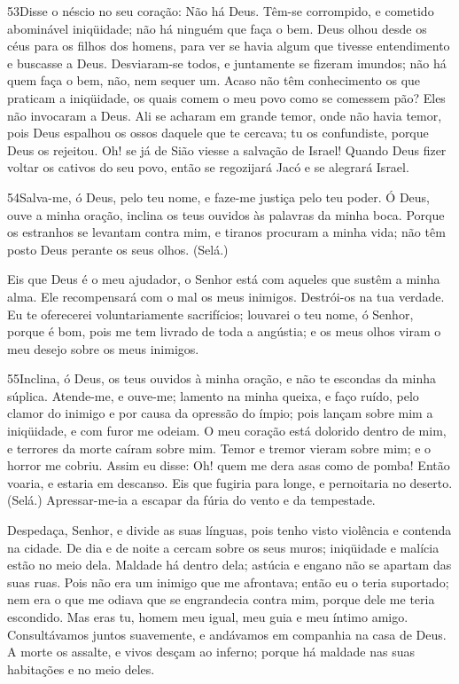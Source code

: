 \bigskip

\lettrine{53}{}Disse o néscio no seu coração: Não há Deus.
Têm-se corrompido, e cometido abominável iniqüidade; não há ninguém
que faça o bem. Deus olhou desde os céus para os filhos dos
homens, para ver se havia algum que tivesse entendimento e buscasse
a Deus. Desviaram-se todos, e juntamente se fizeram imundos; não
há quem faça o bem, não, nem sequer um. Acaso não têm
conhecimento os que praticam a iniqüidade, os quais comem o meu povo
como se comessem pão? Eles não invocaram a Deus. Ali se acharam
em grande temor, onde não havia temor, pois Deus espalhou os ossos
daquele que te cercava; tu os confundiste, porque Deus os rejeitou.
Oh! se já de Sião viesse a salvação de Israel! Quando Deus fizer
voltar os cativos do seu povo, então se regozijará Jacó e se
alegrará Israel.

\bigskip

\lettrine{54}{}Salva-me, ó Deus, pelo teu nome, e faze-me
justiça pelo teu poder. Ó Deus, ouve a minha oração, inclina os
teus ouvidos às palavras da minha boca. Porque os estranhos se
levantam contra mim, e tiranos procuram a minha vida; não têm posto
Deus perante os seus olhos. (Selá.)

Eis que Deus é o meu ajudador, o Senhor está com aqueles que
sustêm a minha alma. Ele recompensará com o mal os meus
inimigos. Destrói-os na tua verdade. Eu te oferecerei
voluntariamente sacrifícios; louvarei o teu nome, ó Senhor, porque é
bom, pois me tem livrado de toda a angústia; e os meus olhos
viram o meu desejo sobre os meus inimigos.

\bigskip

\lettrine{55}{}Inclina, ó Deus, os teus ouvidos à minha oração,
e não te escondas da minha súplica. Atende-me, e ouve-me;
lamento na minha queixa, e faço ruído, pelo clamor do inimigo e
por causa da opressão do ímpio; pois lançam sobre mim a iniqüidade,
e com furor me odeiam. O meu coração está dolorido dentro de
mim, e terrores da morte caíram sobre mim. Temor e tremor vieram
sobre mim; e o horror me cobriu. Assim eu disse: Oh! quem me
dera asas como de pomba! Então voaria, e estaria em descanso.
Eis que fugiria para longe, e pernoitaria no deserto. (Selá.)
Apressar-me-ia a escapar da fúria do vento e da tempestade.

Despedaça, Senhor, e divide as suas línguas, pois tenho visto
violência e contenda na cidade. De dia e de noite a cercam
sobre os seus muros; iniqüidade e malícia estão no meio dela.
Maldade há dentro dela; astúcia e engano não se apartam das
suas ruas. Pois não era um inimigo que me afrontava; então eu
o teria suportado; nem era o que me odiava que se engrandecia contra
mim, porque dele me teria escondido. Mas eras tu, homem meu
igual, meu guia e meu íntimo amigo. Consultávamos juntos
suavemente, e andávamos em companhia na casa de Deus. A morte
os assalte, e vivos desçam ao inferno; porque há maldade nas suas
habitações e no meio deles.


